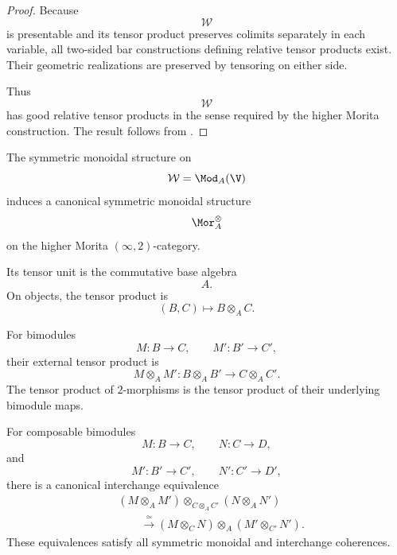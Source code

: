 \begin{proof}
Because
\[
    \mathcal W
\]
is presentable and its tensor product preserves colimits separately in
each variable, all two-sided bar constructions defining relative tensor
products exist. Their geometric realizations are preserved by tensoring
on either side.

Thus
\[
    \mathcal W
\]
has good relative tensor products in the sense required by the higher
Morita construction. The result follows from
\cite[Theorem~1.1]{HaugsengHigherMorita}.
\end{proof}

\begin{proposition}
\label{prop:symmetric-monoidal-higher-morita-category}
The symmetric monoidal structure on
\[
    \mathcal W
    =
    \Mod_A(\V)
\]
induces a canonical symmetric monoidal structure
\[
    \Mor_A^\otimes
\]
on the higher Morita $(\infty,2)$-category.

Its tensor unit is the commutative base algebra
\[
    A.
\]
On objects, the tensor product is
\[
    (B,C)
    \longmapsto
    B\otimes_A C.
\]

For bimodules
\[
    M
    \colon
    B
    \longrightarrow
    C,
    \qquad
    M'
    \colon
    B'
    \longrightarrow
    C',
\]
their external tensor product is
\[
    M\otimes_A M'
    \colon
    B\otimes_A B'
    \longrightarrow
    C\otimes_A C'.
\]
The tensor product of $2$-morphisms is the tensor product of their
underlying bimodule maps.

For composable bimodules
\[
    M
    \colon
    B
    \longrightarrow
    C,
    \qquad
    N
    \colon
    C
    \longrightarrow
    D,
\]
and
\[
    M'
    \colon
    B'
    \longrightarrow
    C',
    \qquad
    N'
    \colon
    C'
    \longrightarrow
    D',
\]
there is a canonical interchange equivalence
\[
\begin{aligned}
    &
    (M\otimes_A M')
    \otimes_{C\otimes_A C'}
    (N\otimes_A N')
    \\
    &\qquad\xrightarrow{\;\simeq\;}
    (M\otimes_C N)
    \otimes_A
    (M'\otimes_{C'}N').
\end{aligned}
\]
These equivalences satisfy all symmetric monoidal and interchange
coherences.
\end{proposition}


